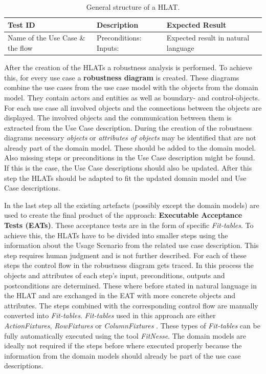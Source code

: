 \begin{table}[H]
	\begin{small}
	\caption{General structure of a HLAT.}
	\renewcommand{\arraystretch}{1.5}
	\begin{tabularx}{\textwidth}{X|X|X}
		\hline
  		\textbf{Test ID} & \textbf{Description} & \textbf{Expected \newline Result} \\
  		\hline
  		Name of the Use Case \& the flow & Preconditions: \newline Inputs: & Expected result in natural language \\
  		\hline
 	\end{tabularx}
 	\renewcommand{\arraystretch}{1}
 	\label{fig:1}
 	\end{small}	
\end{table}


After the creation of the HLATs a robustness analysis is performed.
To achieve this, for every use case a \textbf{robustness diagram} is created.
These diagrams combine the use cases from the use case model with the objects from the domain model.
They contain actors and entities as well as boundary- and control-objects.
For each use case all involved objects and the connections between the objects are displayed.
The involved objects and the communication between them is extracted from the Use Case description.
During the creation of the robustness diagrams necessary \textit{objects} or \textit{attributes of objects} may be identified that are not already part of the domain model.
These should be added to the domain model.
Also missing steps or preconditions in the Use Case description might be found.
If this is the case, the Use Case descriptions should also be updated.
After this step the HLATs should be adapted to fit the updated domain model and Use Case descriptions.

In the last step all the existing artefacts (possibly except the domain models) are used to create the final product of the approach: \textbf{Executable Acceptance Tests (EATs)}.
These acceptance tests are in the form of specific \textit{Fit-tables}.
To achieve this, the HLATs have to be divided into smaller steps using the information about the Usage Scenario from the related use case description.
This step requires human judgment and is not further described.
For each of these steps the control flow in the robustness diagram gets traced.
In this process the objects and attributes of each step's input, preconditions, outputs and postconditions are determined.
These where before stated in natural language in the HLAT and are exchanged in the EAT with more concrete objects and attributes.
The steps combined with the corresponding control flow are manually converted into \textit{Fit-tables}.
\textit{Fit-tables} used in this approach are either \textit{ActionFixtures}, \textit{RowFixtures} or \textit{ColumnFixtures} \cite{Fit-tables}.
These types of \textit{Fit-tables} can be fully automatically executed using the tool \textit{FitNesse}.
The domain models are ideally not required if the steps before where executed properly because the information from the domain models should already be part of the use case descriptions.

